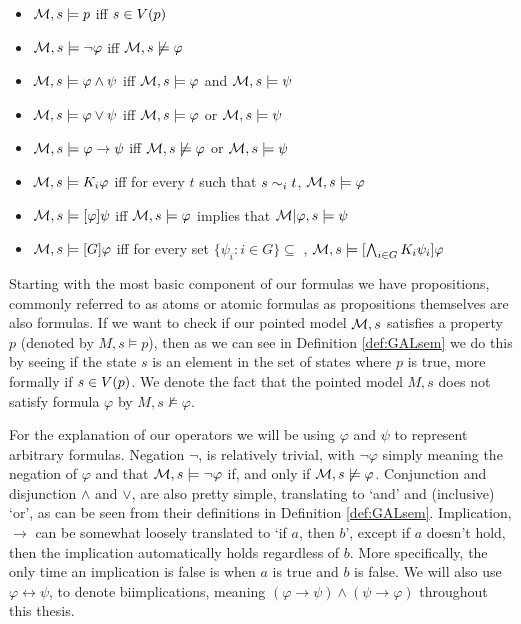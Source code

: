 \begin{definition} \hfill
	\label{def:GALsem}
	\begin{itemize}
		\item[] $\mathcal{M},s \models p $ iff $ s \in V(p)$
		\item[] $\mathcal{M},s \models \neg\varphi$ iff $ \mathcal{M},s \not\models \varphi$
		\item[] $\mathcal{M},s \models \varphi \wedge \psi $ iff $ \mathcal{M},s \models \varphi $ and $ \mathcal{M},s \models \psi$
		\item[] $\mathcal{M},s \models \varphi \vee \psi $ iff $ \mathcal{M},s \models \varphi $ or $ \mathcal{M},s \models \psi$
		\item[] $\mathcal{M},s \models \varphi \rightarrow \psi $ iff $ \mathcal{M},s \not\models \varphi $ or $ \mathcal{M},s \models \psi$
		\item[] $\mathcal{M},s \models K_i\varphi $ iff for every $t$ such that $s\sim_{i}t$, $\mathcal{M},s \models \varphi$
		\item[] $\mathcal{M},s \models [\varphi]\psi $ iff $ \mathcal{M},s \models \varphi $ implies that $ \mathcal{M}|\varphi,s \models \psi$
		\item[] $\mathcal{M},s \models [G]\varphi $ iff for every set $\{\psi_i: i \in G\} \subseteq $ , $ \mathcal{M},s \models [\bigwedge_{i\in G}K_i\psi_i]\varphi$ 
	\end{itemize}
\end{definition}


Starting with the most basic component of our formulas we have propositions, commonly referred to as atoms or atomic formulas as propositions themselves are also formulas. If we want to check if our pointed model $\mathcal{M},s$ satisfies a property $p$ (denoted by $M,s\models p$), then as we can see in Definition \ref{def:GALsem} we do this by seeing if the state $s$ is an element in the set of states where $p$ is true, more formally if $s \in V(p)$. We denote the fact that the pointed model $M,s$ does not satisfy formula $\varphi$ by $M,s \not\models\varphi$.

For the explanation of our operators we will be using $\varphi$ and $\psi$ to represent arbitrary formulas. Negation $\neg$, is relatively trivial, with $\neg\varphi$ simply meaning the negation of $\varphi$ and that $\mathcal{M},s \models \neg\varphi$ if, and only if $\mathcal{M},s \not\models\varphi$. Conjunction and disjunction $\wedge$ and $\vee$, are also pretty simple, translating to `and' and (inclusive) `or', as can be seen from their definitions in Definition \ref{def:GALsem}. Implication, $\rightarrow$ can be somewhat loosely translated to `if $a$, then $b$', except if $a$ doesn't hold, then the implication automatically holds regardless of $b$. More specifically, the only time an implication is false is when $a$ is true and $b$ is false. We will also use $\varphi \leftrightarrow \psi$, to denote biimplications, meaning $(\varphi \rightarrow \psi) \wedge (\psi \rightarrow \varphi)$ throughout this thesis. 

